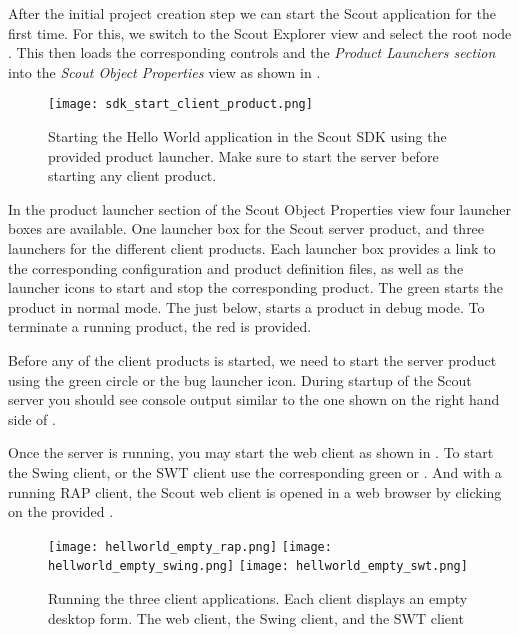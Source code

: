 %

After the initial project creation step we can start the Scout application for the first time.
For this, we switch to the Scout Explorer view and select the root node .
This then loads the corresponding controls and the \textit{Product Launchers section} into the \textit{Scout Object Properties} view as shown in .

\begin{figure}
\texttt{[image: sdk\_start\_client\_product.png]} 
\caption{Starting the Hello World application in the Scout SDK using the provided product launcher. Make sure to start the server before starting any client product.}
\end{figure}

In the product launcher section of the Scout Object Properties view four launcher boxes are available. 
One launcher box for the Scout server product, and three launchers for the different client products.
Each launcher box provides a link to the corresponding configuration and product definition files, as well as the launcher icons to start and stop the corresponding product.
The green  starts the product in normal mode.
The  just below, starts a product in debug mode.
To terminate a running product, the red  is provided. 

Before any of the client products is started, we need to start the server product using the green circle or the bug launcher icon.
During startup of the Scout server you should see console output similar to the one shown on the right hand side of .


Once the server is running, you may start the web client as shown in .
To start the Swing client, or the SWT client use the corresponding green  or .
And with a running RAP client, the Scout web client is opened in a web browser by clicking on the provided .

\begin{figure}
\texttt{[image: hellworld\_empty\_rap.png]} \hspace{3mm}
\texttt{[image: hellworld\_empty\_swing.png]} \hspace{3mm}
\texttt{[image: hellworld\_empty\_swt.png]}
\caption{Running the three client applications. 
Each client displays an empty desktop form. 
The web client, the Swing client, and the SWT client}
\end{figure}

